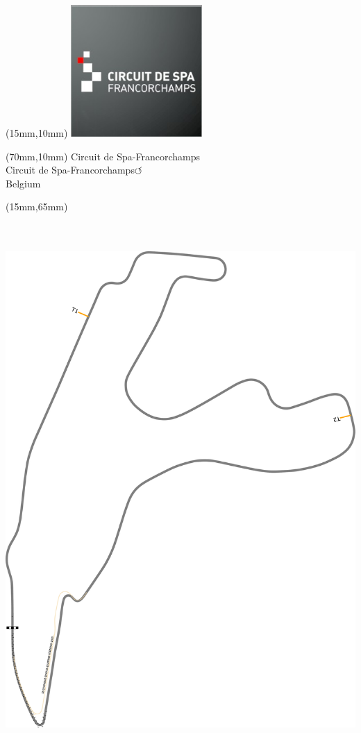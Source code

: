 \null\newpage
\begin{textblock*}{50mm}(15mm,10mm)%
\includegraphics[width=50mm]{LG/2015-05-20_00079.png}
\end{textblock*}
\begin{textblock*}{130mm}(70mm,10mm)%
{\fontsize{20}{20}\selectfont Circuit de Spa-Francorchamps\\}
{\fontsize{16}{16}\selectfont Circuit de Spa-Francorchamps\hfill \huge$\circlearrowleft$\\}
{\fontsize{12}{12}\selectfont Belgium\\}
\end{textblock*}
\begin{textblock*}{185mm}(15mm,65mm)%
\centering
\mbox{\includegraphics[width=185mm,height=210mm,keepaspectratio]{PT/CSPAFR.pdf}}
\end{textblock*}
